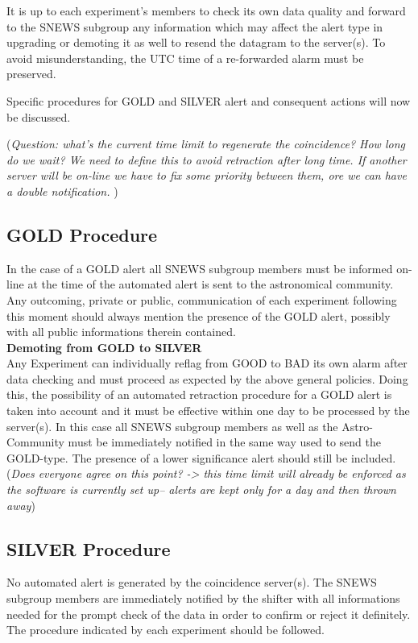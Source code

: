 \documentclass{article}
\begin{document}
It is up to each experiment's members to check
its own data quality and forward to the SNEWS subgroup any information
which may affect the alert type in upgrading or demoting it as well to
resend the datagram to the server(s).  To avoid misunderstanding, the
UTC time of a re-forwarded alarm must be preserved.
 
Specific procedures for GOLD and SILVER alert and consequent actions 
will now be discussed.

({\it Question: what's the current time limit to regenerate the coincidence?
How long do we wait? We need to define this to avoid retraction after long 
time. If another server will be on-line we have to fix some priority between 
them, ore we can have a double notification.
})

\subsection{GOLD Procedure}\label{GOLD}

In the case of a GOLD alert all SNEWS subgroup members must be informed
on-line at the time of the automated alert is sent to the astronomical
community.
Any outcoming, private or public, communication of each experiment following 
this moment should always 
mention the presence of the GOLD alert, possibly with all public informations
therein contained.\\

{\bf Demoting from GOLD to SILVER}\\ Any Experiment can individually
reflag from GOOD to BAD its own alarm after data checking and must
proceed as expected by the above general policies.  Doing this, the
possibility of an automated retraction procedure for a GOLD alert is
taken into account and it must be effective within one day to be
processed by the server(s). In this case all SNEWS subgroup
members as well as the Astro-Community must be immediately notified in
the same way used to send the GOLD-type. The presence of a lower
significance alert should still be included.({\it Does everyone agree
on this point? -> this time limit will already be enforced as
the software is currently set up-- alerts are kept only for a day
and then thrown away})

\subsection{SILVER Procedure}\label{SILVER}
No automated alert is generated by the coincidence server(s). 
The SNEWS subgroup members are immediately notified by the shifter 
with all informations needed for the prompt check of the data in order to 
confirm or reject it definitely.
The procedure indicated by each experiment should be followed.\\
\end{document}
